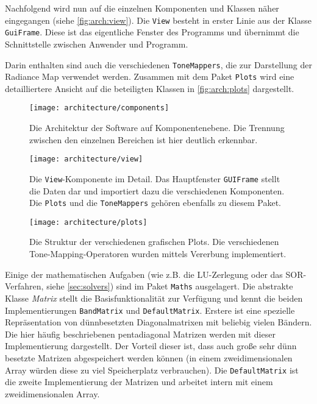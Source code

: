 Nachfolgend wird nun auf die einzelnen Komponenten und Klassen näher eingegangen (siehe \autoref{fig:arch:view}). Die \texttt{View} besteht in erster Linie aus der Klasse \texttt{GuiFrame}. Diese ist das eigentliche Fenster des Programms und übernimmt die Schnittstelle zwischen Anwender und Programm. 

Darin enthalten sind auch die verschiedenen \texttt{ToneMappers}, die zur Darstellung der \gls{Radiance Map} verwendet werden. Zusammen mit dem Paket \texttt{Plots} wird eine detailliertere Ansicht auf die beteiligten Klassen in \autoref{fig:arch:plots} dargestellt.

\begin{figure}[H]
  \begin{center}
    \texttt{[image: architecture/components]}
    \caption{Die Architektur der Software auf Komponentenebene. Die Trennung zwischen den einzelnen Bereichen ist hier deutlich erkennbar.}
    \label{fig:arch:components}
  \end{center}
\end{figure}


\begin{figure}[H]
  \begin{center}
    \texttt{[image: architecture/view]}
    \caption{Die \texttt{View}-Komponente im Detail. Das Hauptfenster \texttt{GUIFrame} stellt die Daten dar und importiert dazu die verschiedenen Komponenten. Die \texttt{Plots} und die \texttt{ToneMappers} gehören ebenfalls zu diesem Paket.}
    \label{fig:arch:view}
  \end{center}
\end{figure}


\begin{figure}[H]
  \begin{center}
    \texttt{[image: architecture/plots]}
    \caption{Die Struktur der verschiedenen grafischen Plots. Die verschiedenen \gls{Tone-Mapping}-Operatoren wurden mittels Vererbung implementiert.}
    \label{fig:arch:plots}
  \end{center}
\end{figure}

Einige der mathematischen Aufgaben (wie z.B. die LU-Zerlegung oder das SOR-Verfahren, siehe \autoref{sec:solvers}) sind im Paket \texttt{Maths} ausgelagert. Die abstrakte Klasse \textit{Matrix} stellt die Basisfunktionalität zur Verfügung und kennt die beiden Implementierungen \texttt{BandMatrix} und \texttt{DefaultMatrix}. Erstere ist eine spezielle Repräsentation von dünnbesetzten Diagonalmatrixen mit beliebig vielen Bändern. Die hier häufig beschriebenen pentadiagonal Matrizen werden mit dieser Implementierung dargestellt. Der Vorteil dieser ist, dass auch große sehr dünn besetzte Matrizen abgespeichert werden können (in einem zweidimensionalen Array würden diese zu viel Speicherplatz verbrauchen). Die \texttt{DefaultMatrix} ist die zweite Implementierung der Matrizen und arbeitet intern mit einem zweidimensionalen Array.

